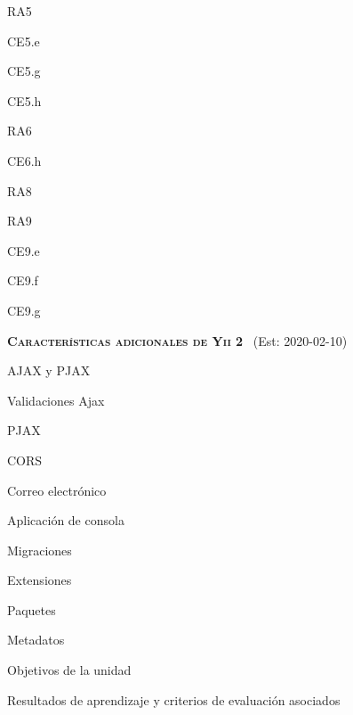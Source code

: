 \begin{longenum}
\begin{longenum}
\begin{longenum}
\begin{longenum}
                \item RA5
                \begin{longenum}
                    \item CE5.e
                    \item CE5.g
                    \item CE5.h
                \end{longenum}
                \item RA6
                \begin{longenum}
                    \item CE6.h
                \end{longenum}
                \item RA8
                \item RA9
                \begin{longenum}
                    \item CE9.e
                    \item CE9.f
                    \item CE9.g
                \end{longenum}
            \end{longenum}
        \end{longenum}
    \end{longenum}
    \item \textbf{\textsc{Características adicionales de Yii 2}} \ (Est: 2020-02-10)
    \begin{longenum}
        \item AJAX y PJAX
        \begin{longenum}
            \item Validaciones Ajax
            \item PJAX \opcional\
            \item CORS \opcional\
        \end{longenum}
        \item Correo electrónico
        \item Aplicación de consola
        \item Migraciones
        \item Extensiones
        \item Paquetes
        \item Metadatos
        \begin{longenum}
            \item Objetivos de la unidad
            \item Resultados de aprendizaje y criterios de evaluación asociados

\end{longenum}
\end{longenum}
\end{longenum}
